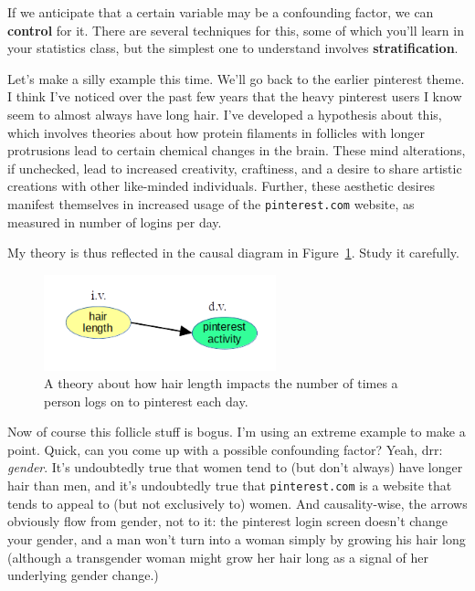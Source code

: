 
If we anticipate that a certain variable may be a confounding factor, we can
\textbf{control} for it. There are several techniques for this, some of which
you'll learn in your statistics class, but the simplest one to understand
involves \textbf{stratification}.


Let's make a silly example this time. We'll go back to the earlier pinterest
theme. I think I've noticed over the past few years that the heavy pinterest
users I know seem to almost always have long hair. I've developed a hypothesis
about this, which involves theories about how protein filaments in follicles
with longer protrusions lead to certain chemical changes in the brain. These
mind alterations, if unchecked, lead to increased creativity, craftiness, and a
desire to share artistic creations with other like-minded individuals. Further,
these aesthetic desires manifest themselves in increased usage of the
\texttt{pinterest.com} website, as measured in number of logins per day.

My theory is thus reflected in the causal diagram in
Figure~\ref{fig:hairPinterest}. Study it carefully.

\begin{figure}[ht]
\centering
\includegraphics[width=0.6\textwidth]{hairPinterest.png}
\caption{A theory about how hair length impacts the number of times a person
logs on to pinterest each day.}
\label{fig:hairPinterest}
\end{figure}

\medskip
Now of course this follicle stuff is bogus. I'm using an extreme example to
make a point. Quick, can you come up with a possible confounding factor? Yeah,
drr: \textit{gender}. It's undoubtedly true that women tend to (but don't
always) have longer hair than men, and it's undoubtedly true that
\texttt{pinterest.com} is a website that tends to appeal to (but not
exclusively to) women. And causality-wise, the arrows obviously flow from
gender, not to it: the pinterest login screen doesn't change your gender, and a
man won't turn into a woman simply by growing his hair long (although a
transgender woman might grow her hair long as a signal of her underlying gender
change.) 

